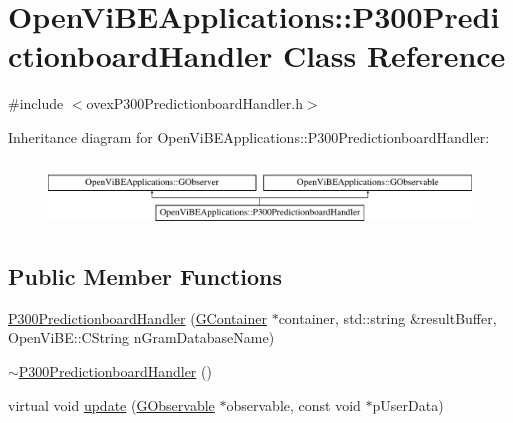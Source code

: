 \hypertarget{classOpenViBEApplications_1_1P300PredictionboardHandler}{
\section{OpenViBEApplications::P300PredictionboardHandler Class Reference}
\label{classOpenViBEApplications_1_1P300PredictionboardHandler}
}


{\ttfamily \#include $<$ovexP300PredictionboardHandler.h$>$}

Inheritance diagram for OpenViBEApplications::P300PredictionboardHandler:\begin{figure}[H]
\begin{center}
\leavevmode
\includegraphics[height=1.761006cm]{classOpenViBEApplications_1_1P300PredictionboardHandler}
\end{center}
\end{figure}
\subsection*{Public Member Functions}
\begin{DoxyCompactItemize}
\item 
\hyperlink{classOpenViBEApplications_1_1P300PredictionboardHandler_a377968045dcd66fb53115211e56d73c4}{P300PredictionboardHandler} (\hyperlink{classOpenViBEApplications_1_1GContainer}{GContainer} $\ast$container, std::string \&resultBuffer, OpenViBE::CString nGramDatabaseName)
\item 
\hyperlink{classOpenViBEApplications_1_1P300PredictionboardHandler_a8759a4acc7322cc868bcde4e17496241}{$\sim$P300PredictionboardHandler} ()
\item 
virtual void \hyperlink{classOpenViBEApplications_1_1P300PredictionboardHandler_a7a56a10030361c0303b5c3dcf430f874}{update} (\hyperlink{classOpenViBEApplications_1_1GObservable}{GObservable} $\ast$observable, const void $\ast$pUserData)
\end{DoxyCompactItemize}
